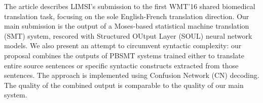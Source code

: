 The article describes LIMSI's submission to the first WMT'16 shared biomedical translation task, focusing on the sole English-French translation direction. Our main submission is the output of a Moses-based statistical machine translation (SMT) system, rescored with Structured OUtput Layer (SOUL) neural network models. We also present an attempt to circumvent syntactic complexity: our proposal combines the outputs of PBSMT systems trained either to translate entire source sentences or specific syntactic constructs extracted from those sentences. The approach is implemented using Confusion Network (CN) decoding. The quality of the combined output is comparable to the quality of our main system.
